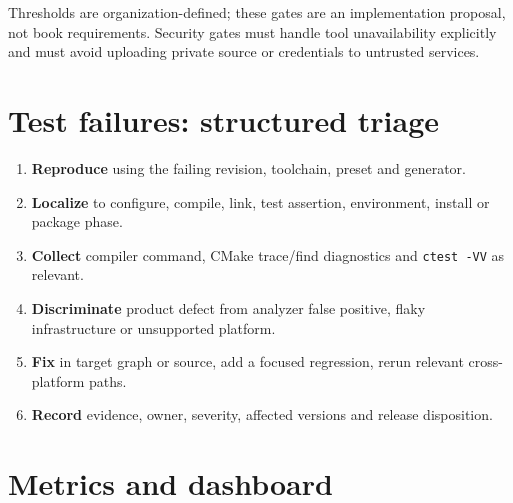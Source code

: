 \documentclass[11pt,letterpaper,oneside]{report}
\providecommand{\tightlist}{\setlength{\itemsep}{0pt}\setlength{\parskip}{0pt}}
\providecommand{\passthrough}[1]{#1}
\begin{document}
Thresholds are organization-defined; these gates are an implementation
proposal, not book requirements. Security gates must handle tool
unavailability explicitly and must avoid uploading private source or
credentials to untrusted services.

\chapter{Test failures: structured
triage}\label{test-failures-structured-triage}

\begin{enumerate}
\def\labelenumi{\arabic{enumi}.}
\tightlist
\item
  \textbf{Reproduce} using the failing revision, toolchain, preset and
  generator.
\item
  \textbf{Localize} to configure, compile, link, test assertion,
  environment, install or package phase.
\item
  \textbf{Collect} compiler command, CMake trace/find diagnostics and
  \passthrough{\lstinline!ctest -VV!} as relevant.
\item
  \textbf{Discriminate} product defect from analyzer false positive,
  flaky infrastructure or unsupported platform.
\item
  \textbf{Fix} in target graph or source, add a focused regression,
  rerun relevant cross-platform paths.
\item
  \textbf{Record} evidence, owner, severity, affected versions and
  release disposition.
\end{enumerate}

\chapter{Metrics and dashboard}\label{metrics-and-dashboard}
\end{document}
